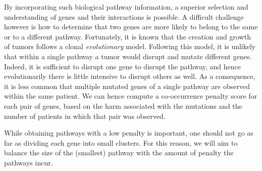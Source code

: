 \documentclass[conference]{IEEEtran}
\begin{document}
By incorporating such biological pathway information, a superior selection and understanding of genes and their interactions is possible. %
%
A difficult challenge however is how to determine that two genes are more likely to belong to the same or to a different pathway. Fortunately, it is known that the creation and growth of tumors follows a clonal \textit{evolutionary} model. Following this model, it is unlikely that within a single pathway a tumor would disrupt and mutate different genes. Indeed, it is sufficient to disrupt one gene to disrupt the pathway, and hence evolutionarily there is little intensive to disrupt others as well. As a consequence, it is less common that multiple mutated genes of a single pathway are observed within the same patient. We can hence compute a co-occurrence penalty score for each pair of genes, based on the harm associated with the mutations and the number of patients in which that pair was observed.

While obtaining pathways with a low penalty is important, one should not go as far as dividing each gene into small clusters. For this reason, we will aim to balance the size of the (smallest) pathway with the amount of penalty the pathways incur.
\end{document}

